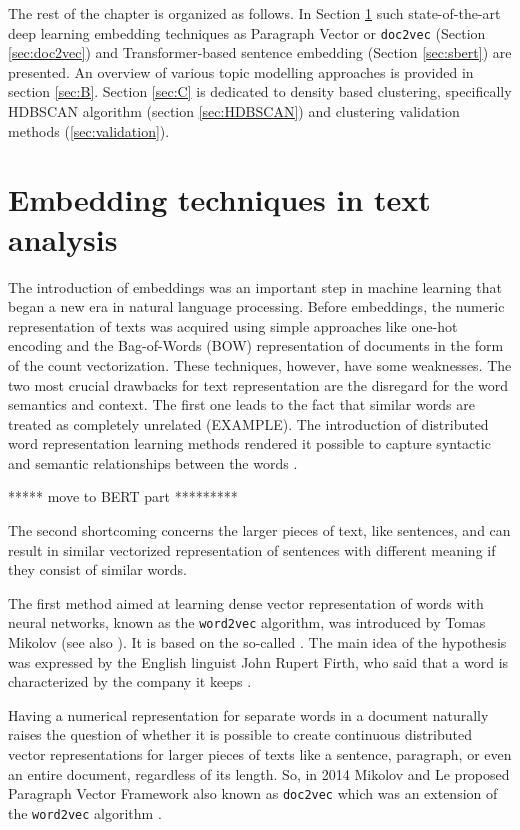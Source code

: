 \documentclass[fontsize=12pt,a4paper,twoside,openany]{scrbook}
\begin{document}
The rest of the chapter is organized as follows. In Section \ref{sec:A} such state-of-the-art deep learning embedding techniques as Paragraph Vector or \verb|doc2vec| (Section \ref{sec:doc2vec}) and Transformer-based sentence embedding (Section \ref{sec:sbert}) are presented. An overview of various topic modelling approaches is provided in section \ref{sec:B}. Section \ref{sec:C} is dedicated to density based clustering, specifically HDBSCAN algorithm (section \ref{sec:HDBSCAN}) and clustering validation methods (\ref{sec:validation}).  

\section{Embedding techniques in text analysis}
\label{sec:A}

The introduction of embeddings was an important step in machine learning that began a new era in natural language processing. Before embeddings, the numeric representation of texts was acquired using simple approaches like one-hot encoding and the Bag-of-Words (BOW) representation of documents in the form of the count vectorization. These techniques, however, have some weaknesses. The two most crucial drawbacks for text representation are the disregard for the word semantics and context. The first one leads to the fact that similar words are treated as completely unrelated (EXAMPLE). The introduction of distributed word representation learning methods rendered it possible to capture syntactic and semantic relationships between the words \parencite{Le14}. 

***** move to BERT part *********

The second shortcoming concerns the larger pieces of text, like sentences, and can result in similar vectorized representation of sentences with different meaning if they consist of similar words. 

The first method aimed at learning dense vector representation of words with neural networks, known as the \verb|word2vec| algorithm, was introduced by Tomas Mikolov \parencite{TMikolov13} (see also \parencite{Mikolov13}). It is based on the so-called  \parencite{Harris54}. The main idea of the hypothesis was expressed by the English linguist John Rupert Firth, who said that a word is characterized by the company it keeps \parencite{Firth57}.

Having a numerical representation for separate words in a document naturally raises the question of whether it is possible to create continuous distributed vector representations for larger pieces of texts like a sentence, paragraph, or even an entire document, regardless of its length. So, in 2014 Mikolov and Le proposed Paragraph Vector Framework also known as \verb|doc2vec| which was an extension of the \verb|word2vec| algorithm \parencite[see][]{Le14}.
\end{document}
